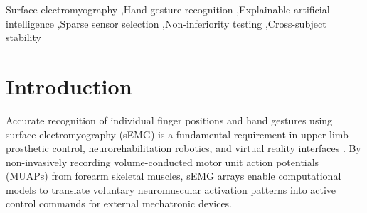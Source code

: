 \documentclass[final,5p,times,twocolumn]{elsarticle}
\begin{document}
\begin{frontmatter}
\begin{abstract}
\textbf{Main Results:} On the full 16-channel array, XGBoost achieved a baseline LOSO Macro-F1 score of $\FullMacroFOne$ [95\% CI: $\FullMacroFOneLCB$, $\FullMacroFOneUCB$]. Cross-fitted TreeSHAP revealed high cross-subject attribution consistency (mean Spearman $\rho = 0.84$). Sparse model optimization established that a reduced array of $k^* = \OptimalK$ channels ($37.5\%$ of full array density) achieved a Macro-F1 of $\SparseMacroFOne$ [95\% CI: $\SparseMacroFOneLCB$, $\SparseMacroFOneUCB$], satisfying statistical non-inferiority ($\text{LCB}_{95\%} = -0.011 > -0.02$). SHAP-guided selection significantly outperformed random selection ($p < 0.001$), uniform geometry-spread, and mutual information baselines. Furthermore, the 6-channel configuration maintained cross-session attribution stability ($\rho = 0.82$) across multi-day recordings and transferred robustly to the external NinaPro DB5 benchmark.

\textbf{Significance:} This study demonstrates that explainability methods can systematically streamline sEMG array density without sacrificing clinical accuracy or inter-subject robustness. The identified 6-channel sensor topology provides an evidence-backed blueprint for low-power, lightweight wearable myoelectric control systems.
\end{abstract}

\begin{keyword}
Surface electromyography \sep Hand-gesture recognition \sep Explainable artificial intelligence \sep Sparse sensor selection \sep Non-inferiority testing \sep Cross-subject stability
\end{keyword}

\end{frontmatter}

\section{Introduction}
Accurate recognition of individual finger positions and hand gestures using surface electromyography (sEMG) is a fundamental requirement in upper-limb prosthetic control, neurorehabilitation robotics, and virtual reality interfaces \cite{13,14,3}. By non-invasively recording volume-conducted motor unit action potentials (MUAPs) from forearm skeletal muscles, sEMG arrays enable computational models to translate voluntary neuromuscular activation patterns into active control commands for external mechatronic devices.
\end{document}
